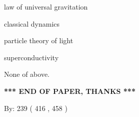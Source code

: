 \documentclass[12pt]{article}
\begin{document}
 
law of universal gravitation
 
 
classical dynamics
 
 
particle theory of light
 
 
superconductivity
 
 
 None of above.
 
 
   
   
\vspace{1.0in} 
{\textbf{\large{ *** END OF PAPER, THANKS *** }}} 
   
   
\hspace{1.0in} By: 
 239 ( 416 ,  458 )
   
   
 
 
\end{document}
